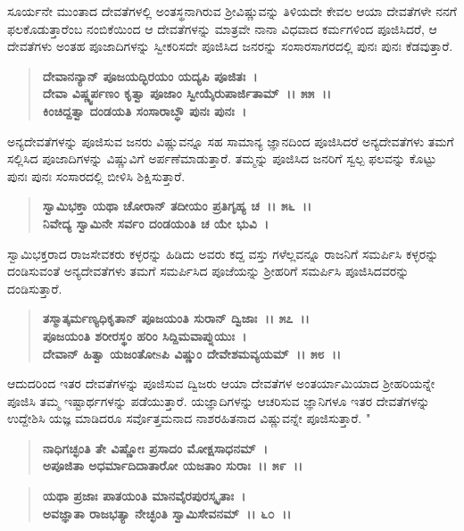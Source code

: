 ಸೂರ್ಯನೇ ಮುಂತಾದ ದೇವತೆಗಳಲ್ಲಿ ಅಂತಸ್ಥನಾಗಿರುವ ಶ‍್ರೀವಿಷ್ಣುವನ್ನು ತಿಳಿಯದೇ ಕೇವಲ ಆಯಾ ದೇವತೆಗಳೇ ನನಗೆ ಫಲಕೊಡುತ್ತಾರೆಂಬ ನಂಬಿಕೆಯಿಂದ ಆ ದೇವತೆ\-ಗಳನ್ನು ಮಾತ್ರವೇ ನಾನಾ ವಿಧವಾದ ಕರ್ಮಗಳಿಂದ ಪೂಜಿಸಿದರೆ, ಆ ದೇವತೆಗಳು ಅಂತಹ ಪೂಜಾದಿಗಳನ್ನು ಸ್ವೀಕರಿಸದೇ ಪೂಜಿಸಿದ ಜನರನ್ನು ಸಂಸಾರಸಾಗರದಲ್ಲಿ ಪುನಃ ಪುನಃ ಕೆಡವುತ್ತಾರೆ.

\begin{verse}
\textbf{ದೇವಾನನ್ಯಾನ್ ಪೂಜಯದ್ಭಿರಯಂ ಯದ್ಯಪಿ ಪೂಜಿತಃ~।}\\\textbf{ದೇವಾ ವಿಷ್ಣ್ವರ್ಪಣಂ ಕೃತ್ವಾ ಪೂಜಾಂ ಸ್ವೀಯೈರುಪಾರ್ಜಿತಾಮ್~।। ೫೫~।।}\\\textbf{ಕಿಂಚಿದ್ದತ್ವಾ ದಂಡಯತಿ ಸಂಸಾರಾಬ್ಧೌ ಪುನಃ ಪುನಃ~।}
\end{verse}

ಅನ್ಯದೇವತೆಗಳನ್ನು ಪೂಜಿಸುವ ಜನರು ವಿಷ್ಣುವನ್ನೂ ಸಹ ಸಾಮಾನ್ಯ ಜ್ಞಾನದಿಂದ ಪೂಜಿಸಿದರೆ ಅನ್ಯದೇವತೆಗಳು ತಮಗೆ ಸಲ್ಲಿಸಿದ ಪೂಜಾದಿಗಳನ್ನು ವಿಷ್ಣುವಿಗೆ ಅರ್ಪಣೆಮಾಡುತ್ತಾರೆ. ತಮ್ಮನ್ನು ಪೂಜಿಸಿದ ಜನರಿಗೆ ಸ್ವಲ್ಪ ಫಲವನ್ನು ಕೊಟ್ಟು ಪುನಃ ಪುನಃ ಸಂಸಾರದಲ್ಲಿ ಬೀಳಿಸಿ ಶಿಕ್ಷಿಸುತ್ತಾರೆ.

\begin{verse}
\textbf{ಸ್ವಾಮಿಭಕ್ತಾ ಯಥಾ ಚೋರಾನ್ ತದೀಯಂ ಪ್ರತಿಗೃಹ್ಯ ಚ~।। ೫೬~।।}\\\textbf{ನಿವೇದ್ಯ ಸ್ವಾಮಿನೇ ಸರ್ವಂ ದಂಡಯಂತಿ ಚ ಯೇ ಭುವಿ~।}
\end{verse}

ಸ್ವಾಮಿಭಕ್ತರಾದ ರಾಜಸೇವಕರು ಕಳ್ಳರನ್ನು ಹಿಡಿದು ಅವರು ಕದ್ದ ವಸ್ತು ಗಳೆಲ್ಲವನ್ನೂ ರಾಜನಿಗೆ ಸಮರ್ಪಿಸಿ ಕಳ್ಳರನ್ನು ದಂಡಿಸುವಂತೆ ಅನ್ಯದೇವತೆಗಳು ತಮಗೆ ಸಮರ್ಪಿಸಿದ ಪೂಜೆಯನ್ನು ಶ‍್ರೀಹರಿಗೆ ಸಮರ್ಪಿಸಿ ಪೂಜಿಸಿದವರನ್ನು ದಂಡಿಸುತ್ತಾರೆ.

\begin{verse}
\textbf{ತಸ್ಮಾತ್ಕರ್ಮಣ್ಯಧಿಕೃತಾನ್ ಪೂಜಯಂತಿ ಸುರಾನ್ ದ್ವಿಜಾಃ~।। ೫೭~।।}\\\textbf{ಪೂಜಯಂತಿ ಶರೀರಸ್ಥಂ ಹರಿಂ ಸಿದ್ದಿಮವಾಪ್ನುಯುಃ~। }\\\textbf{ದೇವಾನ್ ಹಿತ್ವಾ ಯಜಂತೋsಪಿ ವಿಷ್ಣುಂ ದೇವೇಶಮವ್ಯಯಮ್~।। ೫೮~।।}
\end{verse}

ಆದುದರಿಂದ ಇತರ ದೇವತೆಗಳನ್ನು ಪೂಜಿಸುವ ದ್ವಿಜರು ಆಯಾ ದೇವತೆಗಳ ಅಂತ\-ರ್ಯಾಮಿಯಾದ ಶ‍್ರೀಹರಿಯನ್ನೇ ಪೂಜಿಸಿ ತಮ್ಮ ಇಷ್ಟಾರ್ಥಗಳನ್ನು ಪಡೆಯುತ್ತಾರೆ. ಯಜ್ಞಾದಿಗಳನ್ನು ಆಚರಿಸುವ ಜ್ಞಾನಿಗಳೂ ಇತರ ದೇವತೆಗಳನ್ನು ಉದ್ದೇಶಿಸಿ ಯಜ್ಞ ಮಾಡಿದರೂ ಸರ್ವೊತ್ತಮನಾದ ನಾಶರಹಿತನಾದ ವಿಷ್ಣುವನ್ನೇ ಪೂಜಿಸುತ್ತಾರೆ. "

\begin{verse}
\textbf{ನಾಧಿಗಚ್ಛಂತಿ ತೇ ವಿಷ್ಣೋಃ ಪ್ರಸಾದಂ ಮೋಕ್ಷಸಾಧನಮ್~।}\\\textbf{ಅಪೂಜಿತಾ ಅಧರ್ಮಾದಿದಾತಾರೋ ಯಜತಾಂ ಸುರಾಃ~।। ೫೯~।। }
\end{verse}

\begin{verse}
\textbf{ಯಥಾ ಪ್ರಜಾಃ ಪಾತಯಂತಿ ಮಾನವೈರಪುರಸ್ಕೃತಾಃ~।}\\\textbf{ಅವಜ್ಞಾತಾ ರಾಜಭತ್ಯಾ ನೇಚ್ಛಂತಿ ಸ್ವಾಮಿಸೇವನಮ್~।। ೬೦~।।}
\end{verse}

